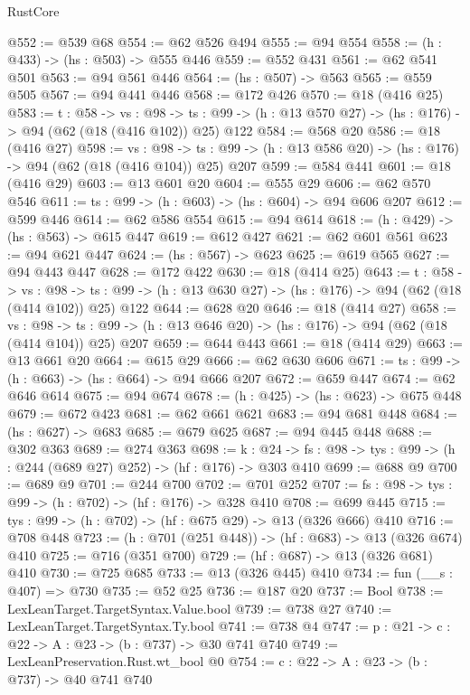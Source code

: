 \begin{lexlean}{RustCore}
\begin{coremodule}
@552 := @539 @68
@554 := @62 @526 @494
@555 := @94 @554
@558 := (h : @433) -> (hs : @503) -> @555 @446
@559 := @552 @431
@561 := @62 @541 @501
@563 := @94 @561 @446
@564 := (hs : @507) -> @563
@565 := @559 @505
@567 := @94 @441 @446
@568 := @172 @426
@570 := @18 (@416 @25)
@583 := {t : @58} ->
  {vs : @98} ->
  {ts : @99} -> (h : @13 @570 @27) -> (hs : @176) -> @94 (@62 (@18 (@416 @102)) @25) @122
@584 := @568 @20
@586 := @18 (@416 @27)
@598 := {vs : @98} ->
  {ts : @99} -> (h : @13 @586 @20) -> (hs : @176) -> @94 (@62 (@18 (@416 @104)) @25) @207
@599 := @584 @441
@601 := @18 (@416 @29)
@603 := @13 @601 @20
@604 := @555 @29
@606 := @62 @570 @546
@611 := {ts : @99} -> (h : @603) -> (hs : @604) -> @94 @606 @207
@612 := @599 @446
@614 := @62 @586 @554
@615 := @94 @614
@618 := (h : @429) -> (hs : @563) -> @615 @447
@619 := @612 @427
@621 := @62 @601 @561
@623 := @94 @621 @447
@624 := (hs : @567) -> @623
@625 := @619 @565
@627 := @94 @443 @447
@628 := @172 @422
@630 := @18 (@414 @25)
@643 := {t : @58} ->
  {vs : @98} ->
  {ts : @99} -> (h : @13 @630 @27) -> (hs : @176) -> @94 (@62 (@18 (@414 @102)) @25) @122
@644 := @628 @20
@646 := @18 (@414 @27)
@658 := {vs : @98} ->
  {ts : @99} -> (h : @13 @646 @20) -> (hs : @176) -> @94 (@62 (@18 (@414 @104)) @25) @207
@659 := @644 @443
@661 := @18 (@414 @29)
@663 := @13 @661 @20
@664 := @615 @29
@666 := @62 @630 @606
@671 := {ts : @99} -> (h : @663) -> (hs : @664) -> @94 @666 @207
@672 := @659 @447
@674 := @62 @646 @614
@675 := @94 @674
@678 := (h : @425) -> (hs : @623) -> @675 @448
@679 := @672 @423
@681 := @62 @661 @621
@683 := @94 @681 @448
@684 := (hs : @627) -> @683
@685 := @679 @625
@687 := @94 @445 @448
@688 := @302 @363
@689 := @274 @363
@698 := {k : @24} ->
  {fs : @98} -> {tys : @99} -> (h : @244 (@689 @27) @252) -> (hf : @176) -> @303 @410
@699 := @688 @9
@700 := @689 @9
@701 := @244 @700
@702 := @701 @252
@707 := {fs : @98} -> {tys : @99} -> (h : @702) -> (hf : @176) -> @328 @410
@708 := @699 @445
@715 := {tys : @99} -> (h : @702) -> (hf : @675 @29) -> @13 (@326 @666) @410
@716 := @708 @448
@723 := (h : @701 (@251 @448)) -> (hf : @683) -> @13 (@326 @674) @410
@725 := @716 (@351 @700)
@729 := (hf : @687) -> @13 (@326 @681) @410
@730 := @725 @685
@733 := @13 (@326 @445) @410
@734 := fun (__s : @407) => @730
@735 := @52 @25
@736 := @187 @20
@737 := Bool
@738 := LexLeanTarget.TargetSyntax.Value.bool
@739 := @738 @27
@740 := LexLeanTarget.TargetSyntax.Ty.bool
@741 := @738 @4
@747 := {p : @21} -> {c : @22} -> {A : @23} -> (b : @737) -> @30 @741 @740
@749 := LexLeanPreservation.Rust.wt_bool @0
@754 := {c : @22} -> {A : @23} -> (b : @737) -> @40 @741 @740

\end{coremodule}
\end{lexlean}
